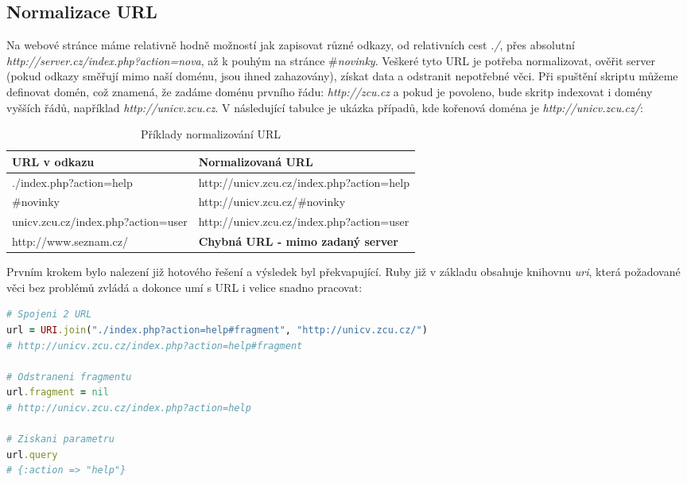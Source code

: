 \documentclass[12pt, a4paper]{report}
\begin{document}
\subsection{Normalizace URL}
Na webové stránce máme relativně hodně možností jak zapisovat různé odkazy, od relativních cest \textit{./}, přes absolutní \textit{http://server.cz/index.php?action=nova}, až k pouhým  na stránce \textit{$\#$novinky}. Veškeré tyto URL je potřeba normalizovat, ověřit server (pokud odkazy směřují mimo naší doménu, jsou ihned zahazovány), získat data a odstranit nepotřebné věci. Při spuštění skriptu můžeme definovat  domén, což znamená, že zadáme doménu prvního řádu: \textit{http://zcu.cz} a pokud je povoleno, bude skritp indexovat i domény vyšších řádů, například \textit{http://unicv.zcu.cz}. V následující tabulce je ukázka případů, kde kořenová doména je \textit{http://unicv.zcu.cz/}:

\begin{table}[!h]
\centering
\begin{tabular}{|l|l|}
\hline
\bf URL v odkazu & \bf Normalizovaná URL \\
\hline
\hline
./index.php?action=help &  http://unicv.zcu.cz/index.php?action=help \\
\hline
$\#$novinky & http://unicv.zcu.cz/$\#$novinky \\
\hline
unicv.zcu.cz/index.php?action=user & http://unicv.zcu.cz/index.php?action=user \\
\hline
http://www.seznam.cz/ & \bf Chybná URL - mimo zadaný server \\
\hline
\end{tabular}
\label{tab:url}
\caption{Příklady normalizování URL}
\end{table}

Prvním krokem bylo nalezení již hotového řešení a výsledek byl překvapující. Ruby již v základu obsahuje knihovnu \textit{uri}, která požadované věci bez problémů zvládá a dokonce umí s URL i velice snadno pracovat:

\begin{lstlisting}[label=equals_classes,language=Ruby, caption=Normalizování URL pomocí třídy URI]
# Spojeni 2 URL
url = URI.join("./index.php?action=help#fragment", "http://unicv.zcu.cz/") 
# http://unicv.zcu.cz/index.php?action=help#fragment

# Odstraneni fragmentu
url.fragment = nil
# http://unicv.zcu.cz/index.php?action=help

# Ziskani parametru
url.query
# {:action => "help"}
\end{lstlisting}
\end{document}
